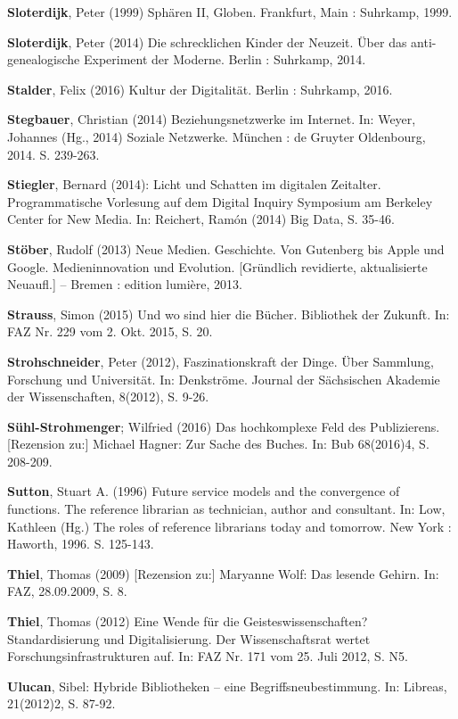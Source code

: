 \documentclass[a4paper,
fontsize=11pt,
oneside,
numbers=noperiodatend,
parskip=half-,
bibliography=totoc,
final
]{scrartcl}
\begin{document}
\textbf{Sloterdijk}, Peter (1999) Sphären II, Globen. Frankfurt, Main :
Suhrkamp, 1999.

\textbf{Sloterdijk}, Peter (2014) Die schrecklichen Kinder der Neuzeit.
Über das anti-genealogische Experiment der Moderne. Berlin : Suhrkamp,
2014.

\textbf{Stalder}, Felix (2016) Kultur der Digitalität. Berlin :
Suhrkamp, 2016.

\textbf{Stegbauer}, Christian (2014) Beziehungsnetzwerke im Internet.
In: Weyer, Johannes (Hg., 2014) Soziale Netzwerke. München : de Gruyter
Oldenbourg, 2014. S. 239-263.

\textbf{Stiegler}, Bernard (2014): Licht und Schatten im digitalen
Zeitalter. Programmatische Vorlesung auf dem Digital Inquiry Symposium
am Berkeley Center for New Media. In: Reichert, Ramón (2014) Big Data,
S. 35-46.

\textbf{Stöber}, Rudolf (2013) Neue Medien. Geschichte. Von Gutenberg
bis Apple und Google. Medieninnovation und Evolution. {[}Gründlich
revidierte, aktualisierte Neuaufl.{]} -- Bremen : edition lumière, 2013.

\textbf{Strauss}, Simon (2015) Und wo sind hier die Bücher. Bibliothek
der Zukunft. In: FAZ Nr. 229 vom 2. Okt. 2015, S. 20.

\textbf{Strohschneider}, Peter (2012), Faszinationskraft der Dinge. Über
Sammlung, Forschung und Universität. In: Denkströme. Journal der
Sächsischen Akademie der Wissenschaften, 8(2012), S. 9-26.

\textbf{Sühl-Strohmenger}; Wilfried (2016) Das hochkomplexe Feld des
Publizierens. {[}Rezension zu:{]} Michael Hagner: Zur Sache des Buches.
In: Bub 68(2016)4, S. 208-209.

\textbf{Sutton}, Stuart A. (1996) Future service models and the
convergence of functions. The reference librarian as technician, author
and consultant. In: Low, Kathleen (Hg.) The roles of reference
librarians today and tomorrow. New York : Haworth, 1996. S. 125-143.

\textbf{Thiel}, Thomas (2009) {[}Rezension zu:{]} Maryanne Wolf: Das
lesende Gehirn. In: FAZ, 28.09.2009, S. 8.

\textbf{Thiel}, Thomas (2012) Eine Wende für die Geisteswissenschaften?
Standardisierung und Digitalisierung. Der Wissenschaftsrat wertet
Forschungsinfrastrukturen auf. In: FAZ Nr. 171 vom 25. Juli 2012, S. N5.

\textbf{Ulucan}, Sibel: Hybride Bibliotheken -- eine
Begriffsneubestimmung. In: Libreas, 21(2012)2, S. 87-92.
\end{document}
